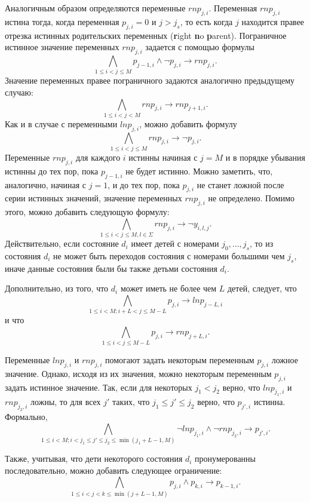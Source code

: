 Аналогичным образом определяются переменные $\mathit{rnp}_{j,i}$.
Переменная $\mathit{rnp}_{j,i}$ истина тогда, когда переменная $p_{j,i} = 0$ и $j > j_{s}$, то есть когда $j$ находится правее отрезка истинных родительских переменных (\textbf{r}ight \textbf{n}o \textbf{p}arent).
Пограничное истинное значение переменных $\mathit{rnp}_{j,i}$ задается с помощью формулы $$\bigwedge_{1 \leq i < j \leq M} p_{j - 1,i} \wedge \neg p_{j, i} \rightarrow \mathit{rnp}_{j,i}.$$
Значение переменных правее пограничного задаются аналогично предыдущему случаю: $$\bigwedge_{1 \leq i < j < M} \mathit{rnp}_{j,i} \rightarrow \mathit{rnp}_{j + 1, i}.$$
Как и в случае с переменными $\mathit{lnp}_{j,i}$, можно добавить формулу $$\bigwedge_{1 \leq i < j \leq M} \mathit{rnp}_{j,i} \rightarrow \neg p_{j,i}.$$
Переменные $\mathit{rnp}_{j,i}$ для каждого $i$ истинны начиная с $j = M$ и в порядке убывания истинны до тех пор, пока $p_{j - 1, i}$ не будет истинно.
Можно заметить, что, аналогично, начиная с $j = 1$, и до тех пор, пока $p_{j,i}$ не станет ложной после серии истинных значений, значение переменных $\mathit{rnp}_{j,i}$ не определено.
Помимо этого, можно добавить следующую формулу: $$\bigwedge_{1 \leq i < j \leq M, l \in \Sigma} \mathit{rnp}_{j,i} \rightarrow \neg y_{i,l,j}.$$
Действительно, если состояние $d_{i}$ имеет детей с номерами $j_{0},\ldots,j_{s}$, то из состояния $d_{i}$ не может быть переходов состояния с номерами б\emph{о}льшими чем $j_{s}$, иначе данные состояния были бы также детьми состояния $d_{i}$. 

Дополнительно, из того, что $d_{i}$ может иметь не более чем $L$ детей, следует, что $$\bigwedge_{1 \leq i < M; i + L < j \leq M - L} p_{j,i} \rightarrow \mathit{lnp}_{j - L, i}$$ и что $$\bigwedge_{1 \leq i < j \leq M - L} p_{j,i} \rightarrow \mathit{rnp}_{j + L, i}.$$

Переменные $\mathit{lnp}_{j,i}$ и $\mathit{rnp}_{j,i}$ помогают задать некоторым переменным $p_{j,i}$ ложное значение.
Однако, исходя из их значения, можно некоторым переменным $p_{j,i}$ задать истинное значение.
Так, если для некоторых $j_{1} < j_{2}$ верно, что $\mathit{lnp}_{j_{1}, i}$ и $\mathit{rnp}_{j_{2}, i}$ ложны, то для всех $j'$ таких, что $j_{1} \leq j' \leq j_{2}$ верно, что $p_{j',i}$ истинна.
Формально, $$\bigwedge_{1 \leq i < M;i < j_{1} \leq j' \leq j_{2} \leq \min\left(j_{1} + L - 1, M\right)} \neg \mathit{lnp}_{j_{1},i} \wedge \neg \mathit{rnp}_{j_{2},i} \rightarrow p_{j',i}.$$

Также, учитывая, что дети некоторого состояния $d_{i}$ пронумерованны последовательно, можно добавить следующее ограничение: $$\bigwedge_{1 \leq i < j < k \leq \min(j + L - 1, M)} p_{j,i} \wedge p_{k,i} \rightarrow p_{k - 1, i}.$$ 

